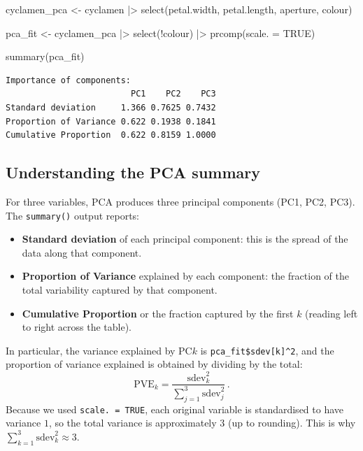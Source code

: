 \documentclass[
  a4paper,
  DIV=11,
  numbers=noendperiod,
  oneside]{scrreprt}
\newenvironment{Shaded}{\begin{snugshade}}{\end{snugshade}}
\newcommand{\AttributeTok}[1]{\textcolor[rgb]{0.40,0.45,0.13}{#1}}
\newcommand{\ConstantTok}[1]{\textcolor[rgb]{0.56,0.35,0.01}{#1}}
\newcommand{\FunctionTok}[1]{\textcolor[rgb]{0.28,0.35,0.67}{#1}}
\newcommand{\NormalTok}[1]{\textcolor[rgb]{0.00,0.23,0.31}{#1}}
\newcommand{\OtherTok}[1]{\textcolor[rgb]{0.00,0.23,0.31}{#1}}
\newcommand{\SpecialCharTok}[1]{\textcolor[rgb]{0.37,0.37,0.37}{#1}}
\providecommand{\tightlist}{%
  \setlength{\itemsep}{0pt}\setlength{\parskip}{0pt}}
\theoremstyle{definition}
\theoremstyle{definition}
\theoremstyle{plain}
\theoremstyle{plain}
\theoremstyle{definition}
\theoremstyle{remark}
\begin{document}
\begin{Shaded}
\begin{Highlighting}[]
\NormalTok{cyclamen\_pca }\OtherTok{\textless{}{-}}\NormalTok{ cyclamen }\SpecialCharTok{|\textgreater{}}
    \FunctionTok{select}\NormalTok{(petal.width, petal.length, aperture, colour)}

\NormalTok{pca\_fit }\OtherTok{\textless{}{-}}\NormalTok{ cyclamen\_pca }\SpecialCharTok{|\textgreater{}} 
    \FunctionTok{select}\NormalTok{(}\SpecialCharTok{!}\NormalTok{colour) }\SpecialCharTok{|\textgreater{}}
    \FunctionTok{prcomp}\NormalTok{(}\AttributeTok{scale. =} \ConstantTok{TRUE}\NormalTok{)}

\FunctionTok{summary}\NormalTok{(pca\_fit)}
\end{Highlighting}
\end{Shaded}

\begin{verbatim}
Importance of components:
                         PC1    PC2    PC3
Standard deviation     1.366 0.7625 0.7432
Proportion of Variance 0.622 0.1938 0.1841
Cumulative Proportion  0.622 0.8159 1.0000
\end{verbatim}

\subsection{Understanding the PCA
summary}\label{understanding-the-pca-summary}

For three variables, PCA produces three principal components (PC1, PC2,
PC3). The \texttt{summary()} output reports:

\begin{itemize}
\tightlist
\item
  \textbf{Standard deviation} of each principal component: this is the
  spread of the data along that component.
\item
  \textbf{Proportion of Variance} explained by each component: the
  fraction of the total variability captured by that component.
\item
  \textbf{Cumulative Proportion} or the fraction captured by the first
  \(k\) (reading left to right across the table).
\end{itemize}

In particular, the variance explained by PC\(k\) is
\texttt{pca\_fit\$sdev{[}k{]}\^{}2}, and the proportion of variance
explained is obtained by dividing by the total:
\[\mathrm{PVE}_k = \frac{\mathrm{sdev}_k^2}{\sum_{j=1}^3 \mathrm{sdev}_j^2} \,.\]
Because we used \texttt{scale.\ =\ TRUE}, each original variable is
standardised to have variance \(1\), so the total variance is
approximately \(3\) (up to rounding). This is why
\(\sum_{k=1}^3 \mathrm{sdev}_k^2 \approx 3\).
\end{document}
